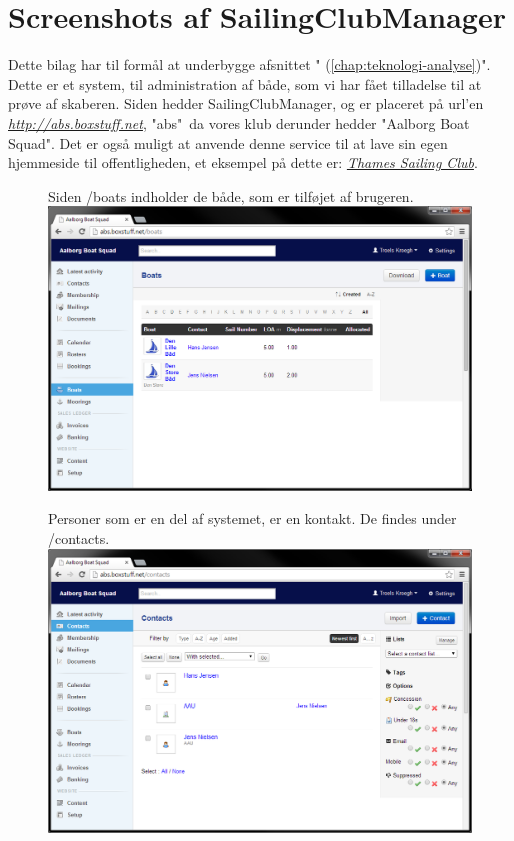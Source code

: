 \chapter{Screenshots af SailingClubManager}\label{bilag:scm}

Dette bilag har til formål at underbygge afsnittet "  (\ref{chap:teknologi-analyse})". Dette er et system, til administration af både, som vi har fået tilladelse til at prøve af skaberen. Siden hedder SailingClubManager, og er placeret på url'en \href{http://abs.boxstuff.net}{\textit{http://abs.boxstuff.net}}, "abs"\ da vores klub derunder hedder "Aalborg Boat Squad". Det er også muligt at anvende denne service til at lave sin egen hjemmeside til offentligheden, et eksempel på dette er: \href{http://www.thamessailingclub.co.uk/}{\textit{Thames Sailing Club}}.

\begin{figure}
	Siden /boats indholder de både, som er tilføjet af brugeren. \newline
	\includegraphics[scale=0.5]{images/teknologi/_Boats}
\end{figure}

\begin{figure}
	Personer som er en del af systemet, er en kontakt. De findes under /contacts.\newline
	\includegraphics[scale=0.5]{images/teknologi/_Contacts}
\end{figure}

